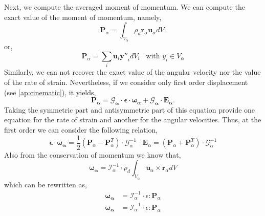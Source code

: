 Next, we compute the averaged moment of momentum. 
We can compute the exact value of the moment of momentum, namely, 
\begin{equation}
    \bm{P}_\alpha 
    = \int_{V_\alpha} \rho_d \bm{r}_\alpha\bm{u}_\alpha dV.
\end{equation}
or,
\begin{equation}
    \bm{P}_{\alpha} 
    =\sum_{i}  \bm{u}_{i}\bm{y''}_{i} dV_i
    \;\;\; \text{with } y_i \in V_\alpha
\end{equation}
Similarly, we can not recover the exact value of the angular velocity nor the value of the rate of strain.
Nevertheless, if we consider only first order displacement (see \ref{ap:cinematic}), it yields, 
\begin{equation}
    \bm{P_\alpha}
    = \bm{\mathcal{G}_\alpha}  \cdot \bm{\epsilon} \cdot \bm{\omega_\alpha} 
    + \bm{\mathcal{G}_\alpha} \cdot \bm{E_\alpha}. 
\end{equation}
Taking the symmetric part and antisymmetric part of this equation provide one equation for the rate of strain and another for the angular velocities. 
Thus, at the first order we can consider the following relation, 
\begin{equation}
    \bm{\epsilon} \cdot \bm{\omega_\alpha}
    = \frac{1}{2}(\bm{P}_\alpha - \bm{P}_\alpha^T) \cdot\bm{\mathcal{G}}_\alpha^{-1}
    \;\;\;
    \bm{E}_\alpha
    =(\bm{P}_\alpha + \bm{P}_\alpha^T)  \cdot\bm{\mathcal{G}}_\alpha^{-1}
\end{equation}
Also from the conservation of momentum we know that, 
\begin{equation}
    \bm{\omega_\alpha}
    = \bm{\mathcal{I}}_\alpha^{-1} \cdot \rho_d \int_{V_\alpha}\bm{u}_\alpha \times\bm{r}_\alpha dV 
\end{equation}
which can be rewritten as, 
\begin{align*}
    \bm{\omega_\alpha}
    &=  \bm{\mathcal{I}}_\alpha^{-1}\cdot\epsilon : \bm{P}_\alpha \\
    \bm{\omega_\alpha}
    &=  \bm{\mathcal{I}}_\alpha^{-1} \cdot \epsilon : \bm{P}_\alpha 
\end{align*}

